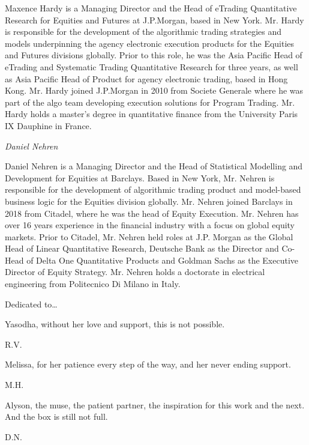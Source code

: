 \noindent Maxence Hardy is a Managing Director and the Head of eTrading Quantitative Research for Equities and Futures at J.P.Morgan, based in New York. Mr. Hardy is responsible for the development of the algorithmic trading strategies and models underpinning the agency electronic execution products for the Equities and Futures divisions globally. Prior to this role, he was the Asia Pacific Head of eTrading and Systematic Trading Quantitative Research for three years, as well as Asia Pacific Head of Product for agency electronic trading, based in Hong Kong. Mr. Hardy joined J.P.Morgan in 2010 from Societe Generale where he was part of the algo team developing execution solutions for Program Trading. Mr. Hardy holds a master's degree in quantitative finance from the University Paris IX Dauphine in France. \bigskip


{\noindent\large\itshape Daniel Nehren} \medskip

\noindent Daniel Nehren is a Managing Director and the Head of Statistical Modelling and Development for Equities at Barclays. Based in New York, Mr. Nehren is responsible for the development of algorithmic trading product and model-based business logic for the Equities division globally. Mr. Nehren joined Barclays in 2018 from Citadel, where he was the head of Equity Execution. Mr. Nehren has over 16 years experience in the financial industry with a focus on global equity markets. Prior to Citadel, Mr. Nehren held roles at J.P. Morgan as the Global Head of Linear Quantitative Research, Deutsche Bank as the Director and Co-Head of Delta One Quantitative Products and Goldman Sachs as the Executive Director of Equity Strategy. Mr. Nehren holds a doctorate in electrical engineering from Politecnico Di Milano in Italy.



\newpage



Dedicated to\dots \vspace{0.5cm}


\begin{minipage}[t]{0.8\textwidth}
	\raggedright
		Yasodha, without her love and support, this is not possible. \par
  	\raggedleft
  	R.V.
\end{minipage} \vspace{1cm}


\begin{minipage}[t]{0.8\textwidth}
	\raggedright
		Melissa, for her patience every step of the way, and her never ending support. \par
  	\raggedleft
  	M.H.
\end{minipage} \vspace{1cm}


\begin{minipage}[t]{0.8\textwidth}
	\raggedright
		Alyson, the muse, the patient partner, the inspiration for this work and the next. And the box is still not full. \par
  	\raggedleft
  	D.N.
\end{minipage} 